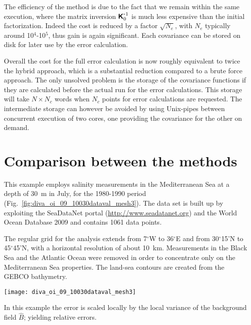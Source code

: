 The efficiency of the method is due to the fact that we remain within the same \diva execution, where the matrix inversion ${\mbox{\boldmath $ \protect\mathsf{K} $}}^{ \mbox{\small{-}} 1}_0$  is much less expensive than the initial factorization. Indeed the cost is reduced by a factor $\sqrt{N_e}$, with $N_e$ typically around 10$^4$-10$^5$, thus gain is again significant. Each covariance can be stored on disk for later use by the error calculation.

Overall the cost for the full error calculation is now roughly equivalent to twice the hybrid approach, which is a substantial reduction compared to a brute force approach. The only unsolved problem is the storage of the covariance functions if they are calculated before the actual \diva run for the error calculations. This storage will take $N \times N_c$ words when $N_c$ points for error calculations are requested. The intermediate storage can however be avoided by using Unix-pipes between concurrent execution of two \diva cores, one providing the covariance for the other on demand.

\section{Comparison between the methods}

This example employs salinity measurements in the Mediterranean Sea at a depth of 30~m in July, for the 1980-1990 period (Fig.~\ref{fig:diva_oi_09_10030dataval_mesh3}). The data set is built up by exploiting the SeaDataNet portal (\url{http://www.seadatanet.org}) and the World Ocean Database 2009 \citep[WOD09,][]{BOYER09} and contains 1061 data points. 

The regular grid for the analysis extends from 7$^{\circ}$W to 36$^{\circ}$E and from 30$^{\circ}$15'N to 45$^{\circ}$45'N, with a horizontal resolution of about 10~km. Measurements in the Black Sea and the Atlantic Ocean were removed in order to concentrate only on the Mediterranean Sea properties. The land-sea contours are created from the GEBCO bathymetry.

\begin{figure*}[h!]
\centering
\texttt{[image: diva\_oi\_09\_10030dataval\_mesh3]}
\caption{Finite-element mesh and salinity measurements used for the application.\label{fig:diva_oi_09_10030dataval_mesh3}}
\end{figure*}

In this example the error is scaled locally by the local variance of the background field $\hat{B}$; yielding relative errors. 

